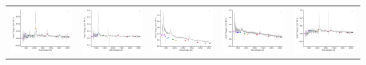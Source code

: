 \begin{center}
\begin{longtable}{l l l l l }
    \includegraphics[width=0.2\linewidth, clip]{Figs/Figs-sdss/spec-4240-55455-0669-STRIPE82-0058-035027.pdf} & \includegraphics[width=0.2\linewidth, clip]{Figs/Figs-sdss/spec-4241-55450-0894-STRIPE82-0062-010390.pdf} & \includegraphics[width=0.2\linewidth, clip]{Figs/Figs-sdss/spec-4302-55531-0350-STRIPE82-0012-042042.pdf} & \includegraphics[width=0.2\linewidth, clip]{Figs/Figs-sdss/spec-4344-55557-0830-STRIPE82-0055-005329.pdf} & \includegraphics[width=0.2\linewidth, clip]{Figs/Figs-sdss/spec-4374-55883-0621-SPLUS-s02s02-030289.pdf} \\

\end{longtable}
\end{center}
